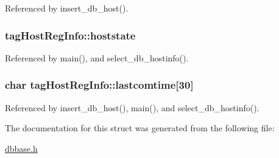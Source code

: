 Referenced by insert\-\_\-db\-\_\-host().

\hypertarget{structtagHostRegInfo_af0ae6c8e57b3b55df0da95e89e9e1753}{
\subsubsection[{hoststate}]{ tag\-Host\-Reg\-Info\-::hoststate}}\label{structtagHostRegInfo_af0ae6c8e57b3b55df0da95e89e9e1753}


Referenced by main(), and select\-\_\-db\-\_\-hostinfo().

\hypertarget{structtagHostRegInfo_a8f4c2089786e0113934f3ecd7c588319}{
\subsubsection[{lastcomtime}]{\setlength{\rightskip}{0pt plus 5cm}char tag\-Host\-Reg\-Info\-::lastcomtime\mbox{[}30\mbox{]}}}\label{structtagHostRegInfo_a8f4c2089786e0113934f3ecd7c588319}


Referenced by insert\-\_\-db\-\_\-host(), main(), and select\-\_\-db\-\_\-hostinfo().



The documentation for this struct was generated from the following file\-:\begin{DoxyCompactItemize}
\item 
\hyperlink{dbbase_8h}{dbbase.\-h}\end{DoxyCompactItemize}

